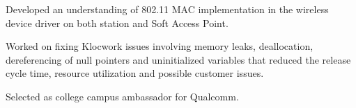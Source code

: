 \documentclass[letterpaper]{deedy-resume} %
\begin{document}
\begin{minipage}[t]{0.76\textwidth}


\sectionspace %

\begin{tightitemize}
\item Developed an understanding of 802.11 MAC implementation in the wireless device driver on both station and Soft Access Point. 
\item Worked on fixing Klocwork issues involving memory leaks, deallocation, dereferencing of null pointers and uninitialized variables that reduced the release cycle time, resource utilization and possible customer issues.
\item Selected as college campus ambassador for Qualcomm.
\end{tightitemize}

\vspace{-1 mm} %

\end{minipage} %

\end{document}

